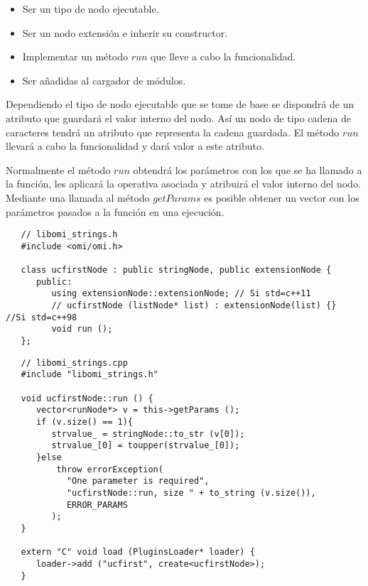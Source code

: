\begin{itemize}
\item Ser un tipo de nodo ejecutable. 
\item Ser un nodo extensión e inherir su constructor.
\item Implementar un método $run$ que lleve a cabo la funcionalidad.
\item Ser añadidas al cargador de módulos.
\end{itemize}

Dependiendo el tipo de nodo ejecutable que se tome de base se dispondrá 
de un atributo que guardará el valor interno del nodo. Así un nodo de tipo cadena
de caracteres tendrá un atributo que representa la cadena guardada. El método 
$run$ llevará a cabo la funcionalidad y dará valor a este atributo.

Normalmente el método $run$ obtendrá los parámetros con los que se ha llamado a la 
función, les aplicará la operativa asociada y atribuirá el valor interno del 
nodo. Mediante una llamada al método $getParams$ es posible obtener un vector
con los parámetros pasados a la función en una ejecución. \\

  

\lstset{language=cpp} 
\begin{lstlisting} 
   // libomi_strings.h
   #include <omi/omi.h>

   class ucfirstNode : public stringNode, public extensionNode {
      public:
         using extensionNode::extensionNode; // Si std=c++11
         // ucfirstNode (listNode* list) : extensionNode(list) {}  //Si std=c++98
         void run ();
   };
\end{lstlisting}

\begin{lstlisting}
   // libomi_strings.cpp
   #include "libomi_strings.h"
   
   void ucfirstNode::run () { 
      vector<runNode*> v = this->getParams ();
      if (v.size() == 1){
         strvalue_ = stringNode::to_str (v[0]);
         strvalue_[0] = toupper(strvalue_[0]);
      }else
          throw errorException(
            "One parameter is required", 
            "ucfirstNode::run, size " + to_string (v.size()), 
            ERROR_PARAMS
         );
   }  
   
   extern "C" void load (PluginsLoader* loader) {
      loader->add ("ucfirst", create<ucfirstNode>);
   }
\end{lstlisting}


